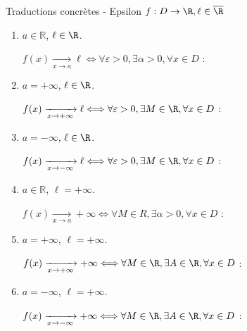 \documentclass[12pt,a4paper]{report}
\begin{document}
\begin{definition}{Traductions concrètes - Epsilon}{}
$f:D \rightarrow \R, \ell \in \overline{\R}$
\begin{enumerate}
    \item $a\in\mathbb{R}$, $\ell\in \R$.
    \begin{center}
        $f(x) \xrightarrow[x\rightarrow a]{} \ell \Longleftrightarrow \forall \varepsilon>0, \exists \alpha >0, \forall x \in D$ :  
    \end{center}
    
    \item $a=+\infty$, $\ell\in \R$.
    \begin{center}
        $f(x) \xrightarrow[x\rightarrow +\infty]{} \ell \Longleftrightarrow \forall \varepsilon>0, \exists M \in \R, \forall x \in D$ :  
    \end{center}
    
    \item $a=-\infty$, $\ell\in \R$.
    \begin{center}
        $f(x) \xrightarrow[x\rightarrow -\infty]{} \ell \Longleftrightarrow \forall \varepsilon>0, \exists M \in \R, \forall x \in D$ :  
    \end{center}
    
    \item $a\in\mathbb{R}$, $\ell=+\infty$.
    \begin{center}
        $f(x) \xrightarrow[x\rightarrow a]{} +\infty \Longleftrightarrow \forall M \in R, \exists \alpha >0, \forall x \in D$ :  
    \end{center}
    
    \item $a = +\infty$, $\ell=+\infty$.
    \begin{center}
        $f(x) \xrightarrow[x\rightarrow +\infty]{} +\infty \Longleftrightarrow \forall M\in \R, \exists A \in \R, \forall x \in D$ :  
    \end{center}
    
    \item $a = -\infty$, $\ell=+\infty$.
    \begin{center}
        $f(x) \xrightarrow[x\rightarrow -\infty]{} +\infty \Longleftrightarrow \forall M\in \R, \exists A \in \R, \forall x \in D$ :  
    \end{center}


\end{enumerate}
\end{definition}
\end{document}
